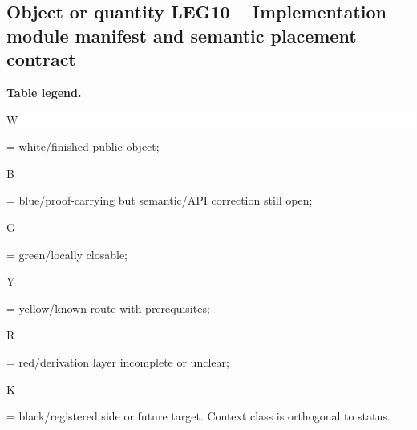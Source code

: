 \subsection*{Object or quantity LEG10 -- Implementation module manifest and semantic placement contract}
\hypertarget{objproof:LEG10}{}
\par\smallskip\noindent\begin{minipage}{0.99\linewidth}\footnotesize\raggedright\textbf{Table legend.} \colorbox{white}{\strut W} = white/finished public object; \colorbox{cyan!20}{\strut B} = blue/proof-carrying but semantic/API correction still open; \colorbox{green!18}{\strut G} = green/locally closable; \colorbox{yellow!25}{\strut Y} = yellow/known route with prerequisites; \colorbox{red!20}{\strut R} = red/derivation layer incomplete or unclear; \colorbox{black!18}{\strut K} = black/registered side or future target. Context class is orthogonal to status.\end{minipage}\par\vspace{0.25em}
